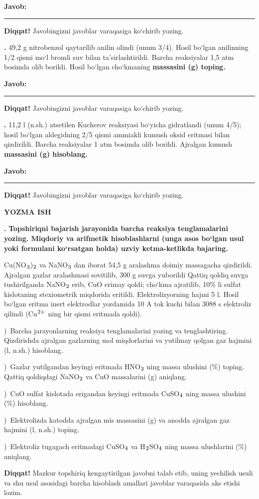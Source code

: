 \documentclass[11pt,a4paper]{article}
\renewcommand{\textsubscript}[1]{\ensuremath{_{\text{\fontsize{8}{8}\selectfont #1}}}}
\renewcommand{\textsuperscript}[1]{\ensuremath{^{\text{\fontsize{8}{8}\selectfont #1}}}}
\newcommand{\qn}[1]{\textbf{\fontsize{11.5}{13}\selectfont #1}}
\newcommand{\qsep}{\par\vspace{13pt}}
\newcommand{\diqqat}[1]{\par\smallskip\noindent\textbf{Diqqat!} #1\par\medskip}
\newcommand{\javob}{\par\nopagebreak[4]\smallskip\noindent\textbf{Javob:} \rule[-2pt]{7.5cm}{0.4pt}\par\smallskip\noindent\textbf{Diqqat!} Javobingizni javoblar varaqasiga ko`chirib yozing.\par\medskip}
\begin{document}
\javob\qsep
\noindent\qn{39.} 49,2 g nitrobenzol qaytarilib anilin olindi (unum 3/4). Hosil bo`lgan anilinning 1/2 qismi mo`l bromli suv bilan ta'sirlashtirildi. Barcha reaksiyalar 1,5 atm bosimda olib borildi. Hosil bo`lgan cho`kmaning \textbf{massasini (g) toping.}
\javob\qsep
\noindent\qn{40.} 11,2 l (n.sh.) atsetilen Kucherov reaksiyasi bo`yicha gidratlandi (unum 4/5); hosil bo`lgan aldegidning 2/5 qismi ammiakli kumush oksid eritmasi bilan qizdirildi. Barcha reaksiyalar 1 atm bosimda olib borildi. Ajralgan kumush \textbf{massasini (g) hisoblang.}
\javob\qsep
\par\bigskip\begin{center}\textbf{\fontsize{13}{15}\selectfont YOZMA ISH}\end{center}
\noindent\qn{41.} \textbf{Topshiriqni bajarish jarayonida barcha reaksiya tenglamalarini yozing. Miqdoriy va arifmetik hisoblashlarni (unga asos bo`lgan usul yoki formulani ko`rsatgan holda) uzviy ketma-ketlikda bajaring.}\par\smallskip
Cu(NO\textsubscript{3})\textsubscript{2} va NaNO\textsubscript{3} dan iborat 54,5 g aralashma doimiy massagacha qizdirildi. Ajralgan gazlar aralashmasi sovitilib, 300 g suvga yuborildi Qattiq qoldiq suvga tushirilganda NaNO\textsubscript{2} erib, CuO erimay qoldi; cho`kma ajratilib, 10\% li sulfat kislotaning stexiometrik miqdorida eritildi. Elektrolizyorning hajmi 5 l. Hosil bo`lgan eritma inert elektrodlar yordamida 10 A tok kuchi bilan 3088 s elektroliz qilindi (Cu\textsuperscript{2+} ning bir qismi eritmada qoldi).\par
{})\ Barcha jarayonlarning reaksiya tenglamalarini yozing va tenglashtiring. Qizdirishda ajralgan gazlarning mol miqdorlarini va yutilmay qolgan gaz hajmini (l, n.sh.) hisoblang.\par
{})\ Gazlar yutilgandan keyingi eritmada HNO\textsubscript{3} ning massa ulushini (\%) toping. Qattiq qoldiqdagi NaNO\textsubscript{2} va CuO massalarini (g) aniqlang.\par
{})\ CuO sulfat kislotada erigandan keyingi eritmada CuSO\textsubscript{4} ning massa ulushini (\%) hisoblang.\par
{})\ Elektrolizda katodda ajralgan mis massasini (g) va anodda ajralgan gaz hajmini (l, n.sh.) toping.\par
{})\ Elektroliz tugagach eritmadagi CuSO\textsubscript{4} va H\textsubscript{2}SO\textsubscript{4} ning massa ulushlarini (\%) aniqlang.\par
\diqqat{Mazkur topshiriq kengaytirilgan javobni talab etib, uning yechilish usuli va shu usul asosidagi barcha hisoblash amallari javoblar varaqasida aks etishi lozim.}\qsep
\end{document}
